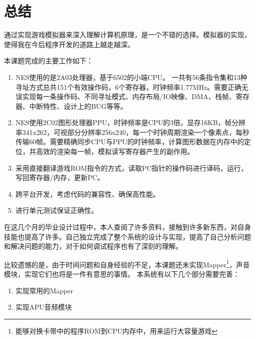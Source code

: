 \documentclass[a4paper]{ltxdoc}
\begin{document}
{\section{总结}
通过实现游戏模拟器来深入理解计算机原理，是一个不错的选择。模拟器的实现，使得我在今后程序开发的道路上越走越深。

本课题完成的主要工作如下：
\begin{enumerate}
\item NES使用的是2A03处理器，基于6502的小端CPU。 一共有56条指令集和13种寻址方式总共151个有效操作码，6个寄存器，时钟频率1.77MHz。需要正确无误实现每一条操作码、不同寻址模式、内存布局/IO映像、DMA、栈帧、寄存器、中断特性、设计上的BUG等等。
\item NES使用2C02图形处理器PPU，时钟频率是CPU的3倍，显存16KB，帧分辨率341x262，可视部分分辨率256x240，每一个时钟周期渲染一个像素点，每秒传输60帧。需要精确同步CPU与PPU的时钟频率，计算图形数据在内存中的定位，并高效的渲染每一帧，模拟读写寄存器产生的副作用。
\item 采用直接翻译游戏ROM指令的方式，读取PC指针的操作码进行译码，运行，写回寄存器/内存，更新PC。
\item 跨平台开发，考虑代码的兼容性、确保高性能。
\item 进行单元测试保证正确性。
\end{enumerate}

在这几个月的毕业设计过程中，本人查阅了许多资料，接触到许多新东西，对自身技能也提高了许多。自己独立完成了整个系统的设计与实现，提高了自己分析问题和解决问题的能力，对于如何调试程序也有了深刻的理解。

比较遗憾的是，由于时间问题和自身经验的不足，本课题还未实现Mapper\footnote{能够对换卡带中的程序ROM到CPU内存中，用来运行大容量游戏}，声音模块，实现它们也将是一件有意思的事情。 本系统有以下几个部分需要完善：
\begin{enumerate}
\item 实现常用的Mapper
\item 实现APU音频模块
\end{enumerate}

}

{
\clearpage %
\nocite{*} %
}
\end{document}

